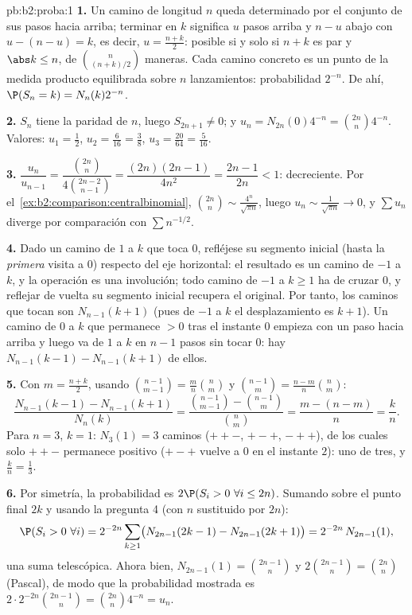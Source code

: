 \begin{solution}{pb:b2:proba:1}
\textbf{1.} Un camino de longitud $n$ queda determinado por el
conjunto de sus pasos hacia arriba; terminar en $k$ significa $u$
pasos arriba y $n - u$ abajo con $u - (n - u) = k$, es decir, $u =
\frac{n+k}2$: posible si y solo si $n + k$ es par y $\abs k \leq n$,
de $\binom{n}{(n+k)/2}$ maneras. Cada camino concreto es un punto de
la medida producto equilibrada sobre $n$ lanzamientos: probabilidad
$2^{-n}$. De ahí, $\P(S_n = k) = N_n(k)2^{-n}$.

\textbf{2.} $S_n$ tiene la paridad de $n$, luego $S_{2n+1} \neq 0$; y
$u_n = N_{2n}(0)4^{-n} = \binom{2n}n4^{-n}$. Valores: $u_1 =
\frac12$, $u_2 = \frac6{16} = \frac38$, $u_3 = \frac{20}{64} =
\frac5{16}$.

\textbf{3.} $\dfrac{u_n}{u_{n-1}} =
\dfrac{\binom{2n}n}{4\binom{2n-2}{n-1}} = \dfrac{(2n)(2n-1)}{4n^2} =
\dfrac{2n-1}{2n} < 1$: decreciente. Por el~\cref{ex:b2:comparison:centralbinomial}, $\binom{2n}n \sim
\frac{4^n}{\sqrt{\pi n}}$, luego $u_n \sim \frac1{\sqrt{\pi n}} \to
0$, y $\sum u_n$ diverge por comparación con $\sum n^{-1/2}$.

\textbf{4.} Dado un camino de $1$ a $k$ que toca $0$, refléjese su
segmento inicial (hasta la \emph{primera} visita a $0$) respecto del
eje horizontal: el resultado es un camino de $-1$ a $k$, y la
operación es una involución; todo camino de $-1$ a $k \geq 1$ ha de
cruzar $0$, y reflejar de vuelta su segmento inicial recupera el
original. Por tanto, los caminos que tocan son $N_{n-1}(k + 1)$
(pues de $-1$ a $k$ el desplazamiento es $k + 1$). Un camino de $0$ a
$k$ que permanece $> 0$ tras el instante $0$ empieza con un paso
hacia arriba y luego va de $1$ a $k$ en $n - 1$ pasos sin tocar $0$:
hay $N_{n-1}(k-1) - N_{n-1}(k+1)$ de ellos.

\textbf{5.} Con $m = \frac{n+k}2$, usando $\binom{n-1}{m-1} = \frac
mn\binom nm$ y $\binom{n-1}{m} = \frac{n-m}n\binom nm$:
\[
\frac{N_{n-1}(k-1) - N_{n-1}(k+1)}{N_n(k)}
= \frac{\binom{n-1}{m-1} - \binom{n-1}{m}}{\binom nm}
= \frac{m - (n - m)}{n} = \frac kn .
\]
Para $n = 3$, $k = 1$: $N_3(1) = 3$ caminos ($++-$, $+-+$, $-++$), de
los cuales solo $++-$ permanece positivo ($+-+$ vuelve a $0$ en el
instante $2$): uno de tres, y $\frac kn = \frac13$.

\textbf{6.} Por simetría, la probabilidad es $2\P(S_i > 0\ \forall i
\leq 2n)$. Sumando sobre el punto final $2k$ y usando la pregunta 4
(con $n$ sustituido por $2n$):
\[
\P(S_i > 0\ \forall i) = 2^{-2n}\sum_{k\geq1}
\bigl(N_{2n-1}(2k-1) - N_{2n-1}(2k+1)\bigr)
= 2^{-2n}\,N_{2n-1}(1),
\]
una suma telescópica. Ahora bien, $N_{2n-1}(1) = \binom{2n-1}{n}$ y
$2\binom{2n-1}n = \binom{2n}n$ (Pascal), de modo que la probabilidad
mostrada es $2\cdot2^{-2n}\binom{2n-1}n = \binom{2n}n4^{-n} = u_n$.


\end{solution}

